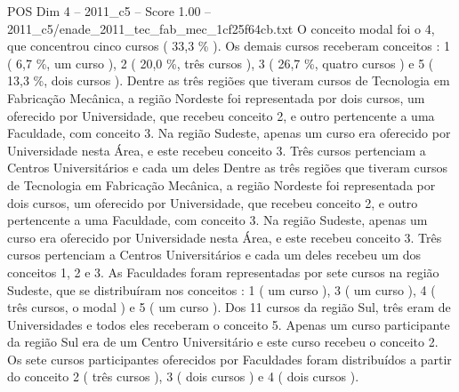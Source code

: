 \begin{textsample}{POS Dim 4 – 2011\_c5 – Score 1.00 – 2011\_c5/enade\_2011\_tec\_fab\_mec\_1cf25f64cb.txt}
O conceito modal foi o 4, que concentrou cinco cursos ( 33,3 \% ).
Os demais cursos receberam conceitos : 1 ( 6,7 \%, um curso ), 2 ( 20,0 \%, três cursos ), 3 ( 26,7 \%, quatro cursos ) e 5 ( 13,3 \%, dois cursos ).
Dentre as três regiões que tiveram cursos de Tecnologia em Fabricação Mecânica, a região Nordeste foi representada por dois cursos, um oferecido por Universidade, que recebeu conceito 2, e outro pertencente a uma Faculdade, com conceito 3.
Na região Sudeste, apenas um curso era oferecido por Universidade nesta Área, e este recebeu conceito 3.
Três cursos pertenciam a Centros Universitários e cada um deles Dentre as três regiões que tiveram cursos de Tecnologia em Fabricação Mecânica, a região Nordeste foi representada por dois cursos, um oferecido por Universidade, que recebeu conceito 2, e outro pertencente a uma Faculdade, com conceito 3.
Na região Sudeste, apenas um curso era oferecido por Universidade nesta Área, e este recebeu conceito 3.
Três cursos pertenciam a Centros Universitários e cada um deles recebeu um dos conceitos 1, 2 e 3.
As Faculdades foram representadas por sete cursos na região Sudeste, que se distribuíram nos conceitos : 1 ( um curso ), 3 ( um curso ), 4 ( três cursos, o modal ) e 5 ( um curso ).
Dos 11 cursos da região Sul, três eram de Universidades e todos eles receberam o conceito 5.
Apenas um curso participante da região Sul era de um Centro Universitário e este curso recebeu o conceito 2.
Os sete cursos participantes oferecidos por Faculdades foram distribuídos a partir do conceito 2 ( três cursos ), 3 ( dois cursos ) e 4 ( dois cursos ).

\end{textsample}
